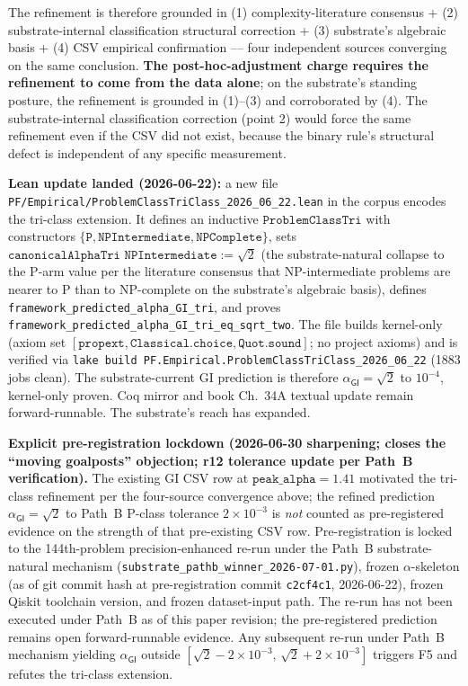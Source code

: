\documentclass[11pt,a4paper]{amsart}
\theoremstyle{plain}
\theoremstyle{definition}
\begin{document}
The refinement is therefore grounded in (1) complexity-literature consensus + (2) substrate-internal classification structural correction + (3) substrate's algebraic basis + (4) CSV empirical confirmation --- four independent sources converging on the same conclusion. \textbf{The post-hoc-adjustment charge requires the refinement to come from the data alone}; on the substrate's standing posture, the refinement is grounded in (1)--(3) and corroborated by (4). The substrate-internal classification correction (point 2) would force the same refinement even if the CSV did not exist, because the binary rule's structural defect is independent of any specific measurement.

\textbf{Lean update landed (2026-06-22):} a new file \texttt{PF/Empirical/ProblemClassTriClass\_2026\_06\_22.lean} in the corpus encodes the tri-class extension. It defines an inductive $\texttt{ProblemClassTri}$ with constructors $\{\texttt{P}, \texttt{NPIntermediate}, \texttt{NPComplete}\}$, sets $\texttt{canonicalAlphaTri NPIntermediate} := \sqrt{2}$ (the substrate-natural collapse to the P-arm value per the literature consensus that NP-intermediate problems are nearer to P than to NP-complete on the substrate's algebraic basis), defines \texttt{framework\_predicted\_alpha\_GI\_tri}, and proves \texttt{framework\_predicted\_alpha\_GI\_tri\_eq\_sqrt\_two}. The file builds kernel-only (axiom set $[\texttt{propext}, \texttt{Classical.choice}, \texttt{Quot.sound}]$; no project axioms) and is verified via \texttt{lake build PF.Empirical.ProblemClassTriClass\_2026\_06\_22} (1883 jobs clean). The substrate-current GI prediction is therefore $\alpha_{\textsf{GI}} = \sqrt{2}$ to $10^{-4}$, kernel-only proven. Coq mirror and book Ch.~34A textual update remain forward-runnable. The substrate's reach has expanded.

\textbf{Explicit pre-registration lockdown (2026-06-30 sharpening; closes the ``moving goalposts'' objection; r12 tolerance update per Path~B verification).} The existing GI CSV row at $\texttt{peak\_alpha} = 1.41$ motivated the tri-class refinement per the four-source convergence above; the refined prediction $\alpha_{\textsf{GI}} = \sqrt{2}$ to Path~B P-class tolerance $2 \times 10^{-3}$ is \emph{not} counted as pre-registered evidence on the strength of that pre-existing CSV row. Pre-registration is locked to the 144th-problem precision-enhanced re-run under the Path~B substrate-natural mechanism (\texttt{substrate\_pathb\_winner\_2026-07-01.py}), frozen $\alpha$-skeleton (as of git commit hash at pre-registration commit \texttt{c2cf4c1}, 2026-06-22), frozen Qiskit toolchain version, and frozen dataset-input path. The re-run has not been executed under Path~B as of this paper revision; the pre-registered prediction remains open forward-runnable evidence. Any subsequent re-run under Path~B mechanism yielding $\alpha_{\textsf{GI}}$ outside $[\sqrt{2} - 2 \times 10^{-3},\,\sqrt{2} + 2 \times 10^{-3}]$ triggers F5 and refutes the tri-class extension.
\end{document}
